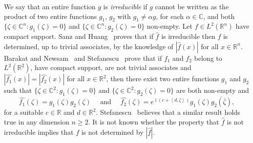 \documentclass[a4paper]{amsart}
\theoremstyle{definition}
\numberwithin{equation}{section}
\begin{document}
We say that an entire function $g$ is \emph{irreducible} if $g$ cannot be written as the product of two entire functions $g_1$, $g_2$ with $g_1\neq{{\alpha}} g$, for each ${{\alpha}}\in{\mathbb{C}}$,  and both $\{{{\zeta}}\in{\mathbb{C}}^n : g_1({{\zeta}})=0\}$ and $\{{{\zeta}}\in{\mathbb{C}}^n : g_2({{\zeta}})=0\}$ non-empty. Let $f\in L^2({\mathbb{R}}^n)$ have compact support.
Sanz and Huang~\cite{Sanz-Huang-1984} proves that if ${\widehat{{{f}}}}$ is irreducible then $f$ is determined, up to trivial associates, by the knowledge of $|{\widehat{{{f}}}}(x)|$ for all $x\in{\mathbb{R}}^n$.
Barakat and Newsam~\cite{Barakat-Newsam-1984} and Stefanescu~\cite{Stefanescu-1985} prove that if $f_1$ and $f_2$ belong to $L^2({\mathbb{R}}^2)$, have compact support, are not trivial associates and $|{\widehat{{{f_1}}}}(x)|=|{\widehat{{{f_2}}}}(x)|$ for all $x\in{\mathbb{R}}^2$, then there exist two entire functions $g_1$ and $g_2$ such that $\{{{\zeta}}\in{\mathbb{C}}^2 : g_1({{\zeta}})=0\}$ and $\{{{\zeta}}\in{\mathbb{C}}^2 : g_2({{\zeta}})=0\}$ are both non-empty and
\begin{equation}\label{factor_barakat}
{\widehat{{{f_1}}}}({{\zeta}})=g_1({{\zeta}})g_2({{\zeta}})\quad\text{ and }\quad {\widehat{{{f_2}}}}({{\zeta}})=e^{{\operatorname{i}}(c+ \left<d,{{\zeta}}\right>)}g_1({{\zeta}}){\overline{{g_2\left({\overline{{{\zeta}}}}\right)}}},
\end{equation}
for a suitable $c\in{\mathbb{R}}$ and $d\in{\mathbb{R}}^2$. Stefanescu~\cite{Stefanescu-personal} believes that a similar result holds true in any dimension $n\geq2$. It is not known whether the property that ${\widehat{{{f}}}}$ is not irreducible implies that $f$ is not determined by $|{\widehat{{{f}}}}|$.
\end{document}
